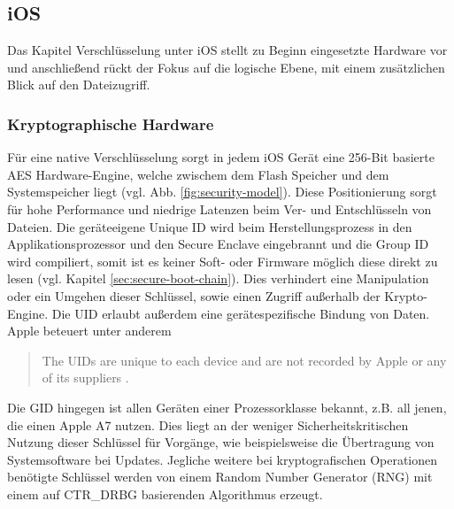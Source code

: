 \subsection{iOS}
	Das Kapitel Verschlüsselung unter iOS stellt zu Beginn eingesetzte Hardware vor
	und anschließend rückt der Fokus auf die logische Ebene, mit einem zusätzlichen
	Blick auf den Dateizugriff.
	\subsubsection{Kryptographische Hardware}\label{sec:crypto-engine}
		Für eine native Verschlüsselung sorgt in jedem iOS Gerät eine 256-Bit
		basierte AES Hardware-Engine, welche zwischem dem Flash	Speicher und dem
		Systemspeicher liegt (vgl. Abb. \ref{fig:security-model}). Diese
		Positionierung sorgt für hohe Performance und niedrige Latenzen beim
		Ver- und Entschlüsseln von Dateien. Die geräteeigene Unique ID wird beim
		Herstellungsprozess in den Applikationsprozessor und den Secure Enclave
		eingebrannt und die Group ID wird compiliert, somit ist es keiner Soft- oder
		Firmware möglich diese direkt zu lesen (vgl. Kapitel
		\ref{sec:secure-boot-chain}). Dies verhindert eine Manipulation oder ein
		Umgehen dieser Schlüssel, sowie einen Zugriff außerhalb der Krypto-Engine.
		Die UID erlaubt außerdem eine gerätespezifische Bindung von Daten. Apple
		beteuert unter anderem
		\begin{quote}
			The UIDs are unique to each device and are not recorded by Apple or any of its
			suppliers \cite[S. 9]{iOSSecurityApr2015}.
		\end{quote}
		Die GID hingegen ist allen Geräten einer
		Prozessorklasse bekannt, z.B.
		all jenen, die einen Apple A7 nutzen. Dies liegt an der weniger
		Sicherheitskritischen Nutzung dieser Schlüssel für Vorgänge,
		wie beispielsweise die Übertragung von Systemsoftware bei Updates. Jegliche
		weitere bei kryptografischen Operationen benötigte Schlüssel werden von einem
		Random Number Generator (RNG) mit einem auf	CTR\_DRBG \cite{NISTDRBG2012}
		basierenden Algorithmus erzeugt.
